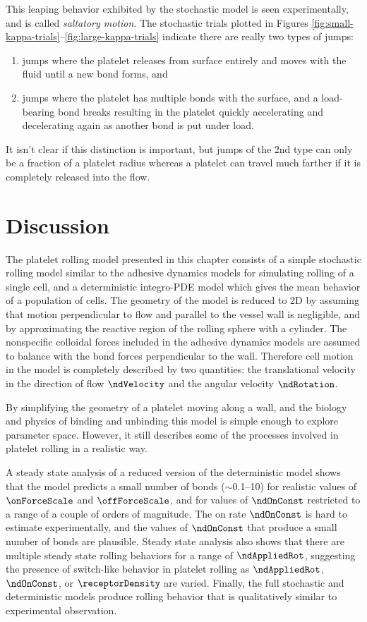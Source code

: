 This leaping behavior exhibited by the stochastic model is
seen experimentally, and is called \emph{saltatory
  motion}. The stochastic trials plotted in Figures
\ref{fig:small-kappa-trials}--\ref{fig:large-kappa-trials} indicate
there are really two types of jumps:
\begin{enumerate}
\item jumps where the platelet releases from surface entirely and
  moves with the fluid until a new bond forms, and
\item jumps where the platelet has multiple bonds with the surface,
  and a load-bearing bond breaks resulting in the platelet quickly
  accelerating and decelerating again as another bond is put under load.
\end{enumerate}
It isn't clear if this distinction is important, but jumps of the 2nd
type can only be a fraction of a platelet radius whereas a platelet
can travel much farther if it is completely released into the flow.

\section{Discussion}
\label{sec:discussion}

The platelet rolling model presented in this chapter consists of a
simple stochastic rolling model similar to the adhesive dynamics
models for simulating rolling of a single cell, and a deterministic
integro-PDE model which gives the mean behavior of a population of
cells. The geometry of the model is reduced to 2D by assuming that
motion perpendicular to flow and parallel to the vessel wall is
negligible, and by approximating the reactive region of the rolling
sphere with a cylinder. The nonspecific colloidal forces included in
the adhesive dynamics models \cite{Hammer2014} are assumed to balance
with the bond forces perpendicular to the wall. Therefore cell motion
in the model is completely described by two quantities: the
translational velocity in the direction of flow $\ndVelocity$ and the
angular velocity $\ndRotation$.

By simplifying the geometry of a platelet moving along a wall, and the
biology and physics of binding and unbinding this model is simple
enough to explore parameter space. However, it still describes some of
the processes involved in platelet rolling in a realistic way.


A steady state analysis of a reduced version of the deterministic
model shows that the model predicts a small number of bonds
($\sim$0.1--10) for realistic values of $\onForceScale$ and
$\offForceScale$, and for values of $\ndOnConst$ restricted to a range
of a couple of orders of magnitude. The on rate $\ndOnConst$ is hard
to estimate experimentally, and the values of $\ndOnConst$ that
produce a small number of bonds are plausible. Steady state analysis
also shows that there are multiple steady state rolling behaviors for
a range of $\ndAppliedRot$, suggesting the presence of switch-like
behavior in platelet rolling as $\ndAppliedRot$, $\ndOnConst$, or
$\receptorDensity$ are varied. Finally, the full stochastic and
deterministic models produce rolling behavior that is qualitatively
similar to experimental observation.

